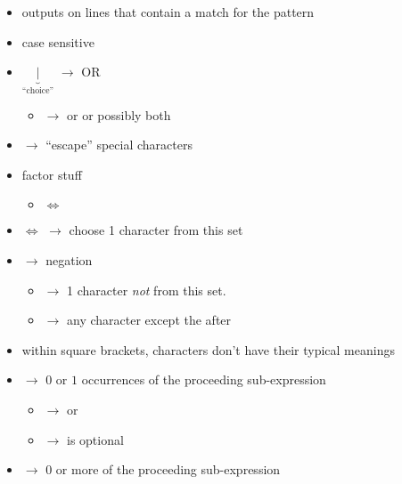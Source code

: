 \begin{itemize}
    \item outputs on  lines that contain a match for the pattern
    \item case sensitive
    \item $ \underbrace{|}_{\text{``choice''}} $ $ \rightarrow $ OR
          \begin{itemize}
              \item {} $ \rightarrow $
                     or  or possibly both
          \end{itemize}
    \item \code{\textbackslash} $ \rightarrow $ ``escape'' special characters
    \item factor stuff
          \begin{itemize}
              \item {} $ \iff $ 
          \end{itemize}
    \item {} $ \iff $  $ \rightarrow $ choose
          1 character from this set
    \item \code{\textasciicircum} $ \rightarrow $ negation
          \begin{itemize}
              \item {} $ \rightarrow $
                    1 character \emph{not} from this set.
              \item {} $ \rightarrow $ any character
                    except the  after 
          \end{itemize}
    \item within square brackets, characters don't have their typical
          meanings
    \item {} $ \rightarrow $ $ 0 $ or $ 1 $ occurrences of the
          proceeding sub-expression
          \begin{itemize}
              \item {} $ \rightarrow $  or 
              \item {} $ \rightarrow $  is optional
          \end{itemize}
    \item \code{*} $ \rightarrow $ 0 or more of the proceeding sub-expression
          \begin{itemize}

\end{itemize}
\end{itemize}
